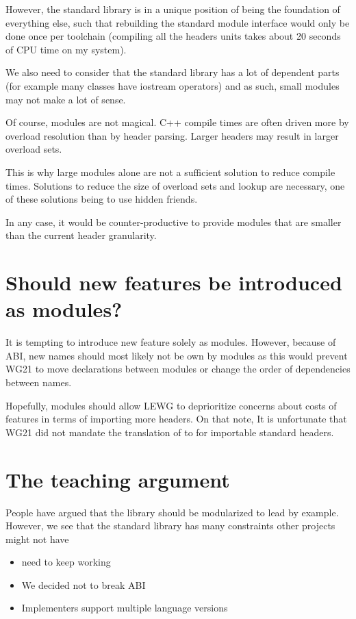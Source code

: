 \documentclass{wg21}
\begin{document}
However, the standard library is in a unique position of being the foundation of everything else, such that rebuilding
the standard module interface would only be done once per toolchain (compiling all the headers units takes about 20 seconds of CPU time on my system).

We also need to consider that the standard library has a lot of dependent parts (for example many classes have iostream operators) and as such, small modules may not make a lot of sense.

Of course, modules are not magical. C++ compile times are often driven more by overload resolution than by header parsing.
Larger headers may result in larger overload sets.

This is why large modules alone are not a sufficient solution to reduce compile times.
Solutions to reduce the size of overload sets and lookup are necessary, one of these solutions being to use hidden friends.

In any case, it would be counter-productive to provide modules that are smaller than the current header granularity.

\section{Should new features be introduced as modules?}

It is tempting to introduce new feature solely as modules.
However, because of ABI, new names should most likely not be own by modules as this would prevent WG21 to move
declarations between modules or change the order of dependencies between names.

Hopefully, modules should allow LEWG to deprioritize concerns about costs of features in terms 
of importing more headers.
On that note, It is unfortunate that WG21 did not mandate the translation of  to  for importable standard
headers. 


\section{The teaching argument}

People have argued that the library should be modularized to lead by example.
However, we see that the standard library has many constraints other projects might not have

\begin{itemize}
 \item {} need to keep working
 \item We decided not to break ABI
 \item Implementers support multiple language versions
\end{itemize}
\end{document}
